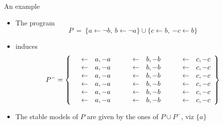 \begin{frame}{An example}
  \begin{itemize}
    \item <1-> The program
          \[
            P
            \ =\
            \{ a \leftarrow {\neg b}, \ b \leftarrow {\neg a}\}
            \cup
            \{c\leftarrow b,\ {-c}\leftarrow b\}
          \]
    \item<2-> [] induces
          \[
            P^-
            =
            \left\{
            \begin{array}{rclp{2pt}rclp{2pt}rcl}
               & \leftarrow & a,{-a} &  &  & \leftarrow & b,{-b} &  &  & \leftarrow & c,{-c} \\
               & \leftarrow & a,{-a} &  &  & \leftarrow & b,{-b} &  &  & \leftarrow & c,{-c} \\
               & \leftarrow & a,{-a} &  &  & \leftarrow & b,{-b} &  &  & \leftarrow & c,{-c} \\
               & \leftarrow & a,{-a} &  &  & \leftarrow & b,{-b} &  &  & \leftarrow & c,{-c} \\
               & \leftarrow & a,{-a} &  &  & \leftarrow & b,{-b} &  &  & \leftarrow & c,{-c} \\
               & \leftarrow & a,{-a} &  &  & \leftarrow & b,{-b} &  &  & \leftarrow & c,{-c} \\
            \end{array}
            \right\}
          \]
    \item<3-> The stable models of $P$ are given by the ones of $P\cup P^-$, viz $\{a\}$
  \end{itemize}
\end{frame}
